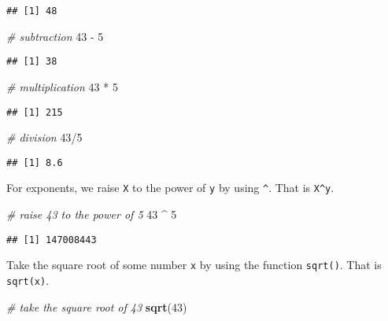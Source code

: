 \documentclass[]{book}
\newenvironment{Shaded}{\begin{snugshade}}{\end{snugshade}}
\newcommand{\KeywordTok}[1]{\textcolor[rgb]{0.13,0.29,0.53}{\textbf{{#1}}}}
\newcommand{\DecValTok}[1]{\textcolor[rgb]{0.00,0.00,0.81}{{#1}}}
\newcommand{\StringTok}[1]{\textcolor[rgb]{0.31,0.60,0.02}{{#1}}}
\newcommand{\CommentTok}[1]{\textcolor[rgb]{0.56,0.35,0.01}{\textit{{#1}}}}
\newcommand{\NormalTok}[1]{{#1}}
\begin{document}
\begin{verbatim}
## [1] 48
\end{verbatim}

\begin{Shaded}
\begin{Highlighting}[]
\CommentTok{# subtraction}
\DecValTok{43} \NormalTok{-}\StringTok{ }\DecValTok{5}
\end{Highlighting}
\end{Shaded}

\begin{verbatim}
## [1] 38
\end{verbatim}

\begin{Shaded}
\begin{Highlighting}[]
\CommentTok{# multiplication}
\DecValTok{43} \NormalTok{*}\StringTok{ }\DecValTok{5}
\end{Highlighting}
\end{Shaded}

\begin{verbatim}
## [1] 215
\end{verbatim}

\begin{Shaded}
\begin{Highlighting}[]
\CommentTok{# division}
\DecValTok{43}\NormalTok{/}\DecValTok{5}
\end{Highlighting}
\end{Shaded}

\begin{verbatim}
## [1] 8.6
\end{verbatim}

For exponents, we raise \texttt{X} to the power of \texttt{y} by using
\texttt{\^{}}. That is \texttt{X\^{}y}.

\begin{Shaded}
\begin{Highlighting}[]
\CommentTok{# raise 43 to the power of 5}
\DecValTok{43} \NormalTok{^}\StringTok{ }\DecValTok{5}
\end{Highlighting}
\end{Shaded}

\begin{verbatim}
## [1] 147008443
\end{verbatim}

Take the square root of some number \texttt{x} by using the function
\texttt{sqrt()}. That is \texttt{sqrt(x)}.

\begin{Shaded}
\begin{Highlighting}[]
\CommentTok{# take the square root of 43}
\KeywordTok{sqrt}\NormalTok{(}\DecValTok{43}\NormalTok{)}
\end{Highlighting}
\end{Shaded}
\end{document}
